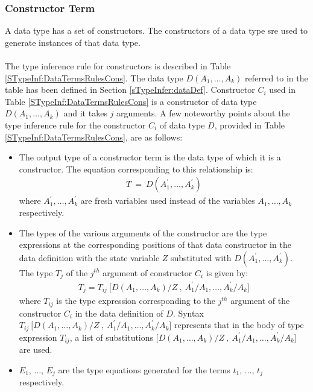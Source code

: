 \documentclass[11pt]{article}
\begin{document}
\subsubsection {Constructor Term} 
A data type has a set of {\sf constructors}. The {\sf constructors} of a data type sre used to generate instances of that data type. 
~~\\~~\\
The type inference rule for {\sf constructors} is described in Table \ref {STypeInf:DataTermsRulesCons}. The data type ${D(A_1,\ldots,A_k)}$ referred to in the table has been defined in Section \ref {sTypeInfer:dataDef}. Constructor ${C_i}$ used in Table \ref {STypeInf:DataTermsRulesCons} is a constructor of data type ${D(A_1,\ldots,A_k)}$ and 
it takes ${j}$ arguments. A few noteworthy points about the type inference rule for the constructor ${C_i}$ of data type $D$, provided in Table \ref {STypeInf:DataTermsRulesCons}, are as follows:
\begin{itemize}
  \item The output type of a constructor term is the data type of which it is a constructor. The equation corresponding to this relationship is:
   \begin{align*}
    T~=~D(A_1^{\prime},\ldots,A_k^{\prime})
   \end{align*}
   where ${A_1^{\prime},\ldots,A_k^{\prime}}$ are fresh variables used instead of the variables ${A_1,\ldots,A_k}$ respectively.
    
  \item The types of the various arguments of the constructor are the type expressions at the corresponding positions of that data constructor in the data definition with the state variable ${Z}$ substituted with ${D(A_1^{\prime},\ldots,A_k^{\prime})}$. The type ${T_j}$ of the ${j^{th}}$ argument of constructor ${C_i}$ is given by:
  \begin{align*}
    T_j = T_{ij}~\big[D(A_1,\ldots,A_k)/Z~,~A_1^{\prime}/A_1,\ldots,A_k^{\prime}/A_k\big]
  \end{align*}
  where ${T_{ij}}$ is the type expression corresponding to the ${j^{th}}$ argument of the constructor ${C_i}$ in the data definition of ${D}$. Syntax ${T_{ij}~\big[D(A_1,\ldots,A_k)/Z~,~A_1^{\prime}/A_1,\ldots,A_k^{\prime}/A_k\big]}$ represents that in the body of type expression
   ${T_{ij}}$, a list of substitutions $\big[D(A_1,\ldots,A_k)/Z~,~A_1^{\prime}/A_1,\ldots,A_k^{\prime}/A_k\big]$ are used. 

  \item $E_1$, $\ldots$, $E_j$ are the type equations generated for the terms $t_1$, $\ldots$, $t_j$ respectively.
\end{itemize}
\end{document}
